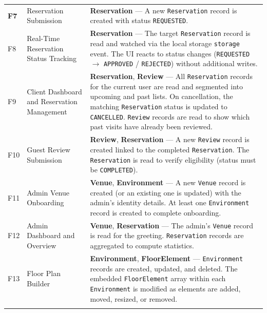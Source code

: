\documentclass[12pt,a4paper]{article}
\begin{document}
\begin{longtable}{>{\bfseries}l L{4.5cm} L{7.5cm}}
    F7 &
    Reservation Submission &
    \textbf{Reservation} ---
    A new \texttt{Reservation} record is created with status
    \texttt{REQUESTED}. \\
    \addlinespace

    F8 &
    Real-Time Reservation Status Tracking &
    \textbf{Reservation} ---
    The target \texttt{Reservation} record is read and watched via
    the local storage \texttt{storage} event. The UI reacts to status
    changes (\texttt{REQUESTED} $\to$ \texttt{APPROVED} /
    \texttt{REJECTED}) without additional writes. \\
    \addlinespace

    F9 &
    Client Dashboard and Reservation Management &
    \textbf{Reservation}, \textbf{Review} ---
    All \texttt{Reservation} records for the current user are read and
    segmented into upcoming and past lists. On cancellation, the
    matching \texttt{Reservation} status is updated to
    \texttt{CANCELLED}. \texttt{Review} records are read to show which
    past visits have already been reviewed. \\
    \addlinespace

    F10 &
    Guest Review Submission &
    \textbf{Review}, \textbf{Reservation} ---
    A new \texttt{Review} record is created linked to the completed
    \texttt{Reservation}. The \texttt{Reservation} is read to verify
    eligibility (status must be \texttt{COMPLETED}). \\
    \addlinespace

    F11 &
    Admin Venue Onboarding &
    \textbf{Venue}, \textbf{Environment} ---
    A new \texttt{Venue} record is created (or an existing one is
    updated) with the admin's identity details. At least one
    \texttt{Environment} record is created to complete onboarding. \\
    \addlinespace

    F12 &
    Admin Dashboard and Overview &
    \textbf{Venue}, \textbf{Reservation} ---
    The admin's \texttt{Venue} record is read for the greeting.
    \texttt{Reservation} records are aggregated to compute statistics. \\
    \addlinespace

    F13 &
    Floor Plan Builder &
    \textbf{Environment}, \textbf{FloorElement} ---
    \texttt{Environment} records are created, updated, and deleted.
    The embedded \texttt{FloorElement} array within each
    \texttt{Environment} is modified as elements are added, moved,
    resized, or removed. \\
    \addlinespace


\end{longtable}
\end{document}
